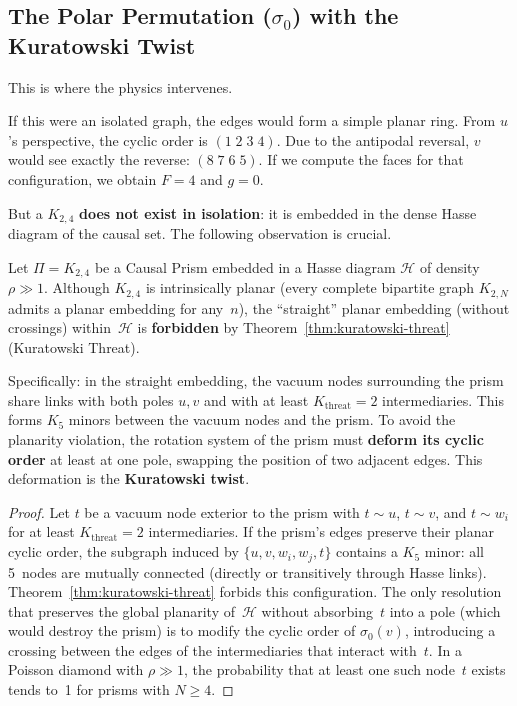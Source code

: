\subsection{The Polar Permutation ($\sigma_0$) with the Kuratowski Twist}
\label{subsec:giro-kuratowski}

This is where the physics intervenes.

If this were an isolated graph, the edges would form
a simple planar ring. From $u$'s perspective, the cyclic order
is $(1\;2\;3\;4)$. Due to the antipodal reversal, $v$ would see
exactly the reverse: $(8\;7\;6\;5)$. If we compute the faces
for that configuration, we obtain $F = 4$ and $g = 0$.

But a $K_{2,4}$ \textbf{does not exist in isolation}: it is embedded in the
dense Hasse diagram of the causal set. The following observation
is crucial.

\begin{lemma}
\label{lem:ambient-nonplanarity}
Let $\Pi = K_{2,4}$ be a Causal Prism embedded in a Hasse diagram
$\mathcal{H}$ of density $\rho \gg 1$. Although $K_{2,4}$ is
intrinsically planar (every complete bipartite graph $K_{2,N}$ admits
a planar embedding for any~$n$), the ``straight'' planar embedding
(without crossings) within~$\mathcal{H}$ is
\textbf{forbidden} by Theorem~\ref{thm:kuratowski-threat} (Kuratowski
Threat).

Specifically: in the straight embedding, the vacuum nodes surrounding
the prism share links with both poles $u, v$ and with at least
$K_{\text{threat}} = 2$ intermediaries. This forms $K_5$ minors
between the vacuum nodes and the prism. To avoid the planarity
violation, the rotation system of the prism must \textbf{deform
its cyclic order} at least at one pole, swapping the position
of two adjacent edges. This deformation is the \textbf{Kuratowski
twist}.
\end{lemma}

\begin{proof}
Let $t$ be a vacuum node exterior to the prism with $t \sim u$,
$t \sim v$, and $t \sim w_i$ for at least $K_{\text{threat}} = 2$
intermediaries. If the prism's edges preserve their planar cyclic order,
the subgraph induced by $\{u, v, w_i, w_j, t\}$ contains a
$K_5$ minor: all 5~nodes are mutually connected (directly or
transitively through Hasse links). Theorem~\ref{thm:kuratowski-threat}
forbids this configuration. The
only resolution that preserves the global planarity
of~$\mathcal{H}$ without absorbing~$t$ into a pole (which would destroy the
prism) is to modify the cyclic order of $\sigma_0(v)$,
introducing a crossing between the edges of the intermediaries that
interact with~$t$. In a Poisson diamond with $\rho \gg 1$,
the probability that at least one such node~$t$ exists tends to~1
for prisms with $N \geq 4$.
\end{proof}

